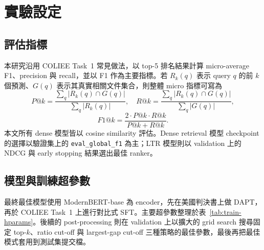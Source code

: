 \section{實驗設定}

\subsection{評估指標}

本研究沿用 COLIEE Task~1 常見做法，以 top-5 排名結果計算 micro-average F1、precision 與 recall，並以 F1 作為主要指標。若 $R_k(q)$ 表示 query $q$ 的前 $k$ 個預測、$G(q)$ 表示其真實相關文件集合，則整體 micro 指標可寫為
\begin{equation}
P@k=
\frac{\sum_q |R_k(q)\cap G(q)|}
{\sum_q |R_k(q)|},
\quad
R@k=
\frac{\sum_q |R_k(q)\cap G(q)|}
{\sum_q |G(q)|},
\end{equation}
\begin{equation}
F1@k=\frac{2 \cdot P@k \cdot R@k}{P@k+R@k}.
\end{equation}
本文所有 dense 模型皆以 cosine similarity 評估。Dense retrieval 模型 checkpoint 的選擇以驗證集上的 \texttt{eval\_global\_f1} 為主；LTR 模型則以 validation 上的 NDCG 與 early stopping 結果選出最佳 ranker。

\subsection{模型與訓練超參數}

最終最佳模型使用 ModernBERT-base 為 encoder，先在美國判決書上做 DAPT，再於 COLIEE Task~1 上進行對比式 SFT。主要超參數整理於表~\ref{tab:train-hparams}。後續的 post-processing 則在 validation 上以擴大的 grid search 搜尋固定 top-$k$、ratio cut-off 與 largest-gap cut-off 三種策略的最佳參數，最後再把最佳模式套用到測試集提交檔。

